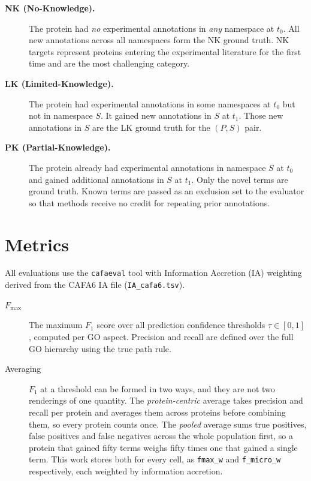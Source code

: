 \begin{description}
  \item[\textbf{NK (No-Knowledge).}]
    The protein had \emph{no} experimental annotations in \emph{any} namespace
    at $t_0$. All new annotations across all namespaces form the NK ground truth.
    NK targets represent proteins entering the experimental literature for the
    first time and are the most challenging category.

  \item[\textbf{LK (Limited-Knowledge).}]
    The protein had experimental annotations in some namespaces at $t_0$ but
    not in namespace $S$. It gained new annotations in $S$ at $t_1$. Those new
    annotations in $S$ are the LK ground truth for the $(P, S)$ pair.

  \item[\textbf{PK (Partial-Knowledge).}]
    The protein already had experimental annotations in namespace $S$ at $t_0$
    and gained additional annotations in $S$ at $t_1$. Only the novel terms are
    ground truth. Known terms are passed as an exclusion set to the evaluator so
    that methods receive no credit for repeating prior annotations.
\end{description}

\section{Metrics}
\label{sec:metrics}

All evaluations use the \texttt{cafaeval} tool with Information Accretion (IA)
weighting derived from the CAFA6 IA file (\texttt{IA\_cafa6.tsv}).

\begin{description}
  \item[$F_{\max}$] The maximum $F_1$ score over all prediction confidence
    thresholds $\tau \in [0, 1]$, computed per GO aspect. Precision and recall
    are defined over the full GO hierarchy using the true path rule.
  \item[Averaging] $F_1$ at a threshold can be formed in two ways, and they are
    not two renderings of one quantity. The \emph{protein-centric} average takes
    precision and recall per protein and averages them across proteins before
    combining them, so every protein counts once. The \emph{pooled} average sums
    true positives, false positives and false negatives across the whole
    population first, so a protein that gained fifty terms weighs fifty times one
    that gained a single term. This work stores both for every cell, as
    \texttt{fmax\_w} and \texttt{f\_micro\_w} respectively, each weighted by
    information accretion.
\end{description}

